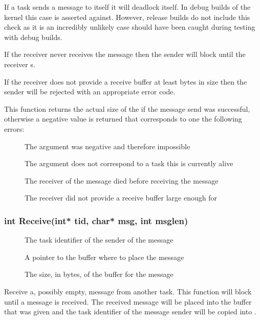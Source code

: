 \documentclass[pdftex,10pt,a4paper]{article}
\begin{document}
If a task sends a message to itself it will deadlock itself. In debug
builds of the kernel this case is asserted against. However, release
builds do not include this check as it is an incredibly unlikely case
should have been caught during testing with debug builds.

If the receiver never receives the message then the sender will block
until the receiver s.

If the receiver does not provide a receive buffer at least
 bytes in size then the sender will be rejected with an
appropriate error code.

This function returns the actual size of the  if the
message send was successful, otherwise a negative value is returned
that corresponds to one the following errors:

\begin{description}
\item[] The  argument was negative
  and therefore impossible
\item[] The  argument does not
  correspond to a task this is currently alive
\item[] The receiver of the message died before
  receiving the message
\item[] The receiver did not provide a
  receive buffer large enough for 
\end{description}


\subsubsection*{int Receive(int* tid, char* msg, int msglen)}

\begin{description}
\item[] The task identifier of the sender of the message
\item[] A pointer to the buffer where to place the message
\item[] The size, in bytes, of the buffer for the message
\end{description}

Receive a, possibly empty, message from another task. This function
will block until a message is received. The received message will be
placed into the  buffer that was given and the task
identifier of the message sender will be copied into .
\end{document}
